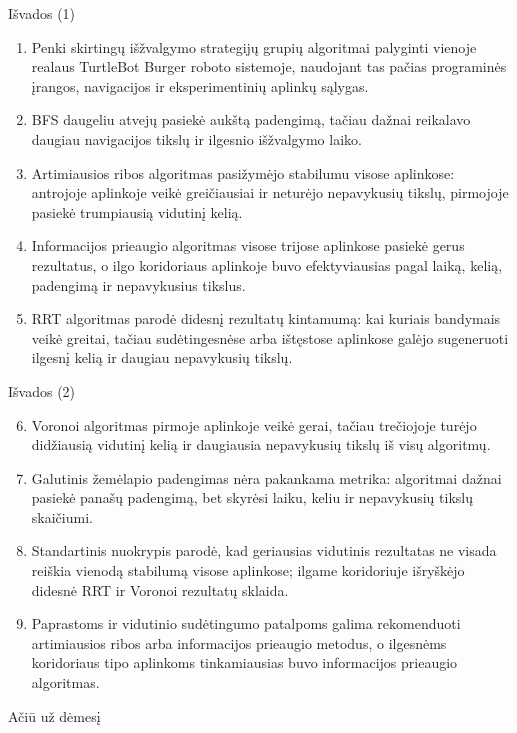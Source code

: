\documentclass[12pt]{beamer}
\begin{document}
\begin{frame}{Išvados (1)}
    \scriptsize
    \begin{enumerate}
        \item Penki skirtingų išžvalgymo strategijų grupių algoritmai palyginti vienoje realaus TurtleBot Burger roboto sistemoje, naudojant tas pačias programinės įrangos, navigacijos ir eksperimentinių aplinkų sąlygas.
        \item BFS daugeliu atvejų pasiekė aukštą padengimą, tačiau dažnai reikalavo daugiau navigacijos tikslų ir ilgesnio išžvalgymo laiko.
        \item Artimiausios ribos algoritmas pasižymėjo stabilumu visose aplinkose: antrojoje aplinkoje veikė greičiausiai ir neturėjo nepavykusių tikslų, pirmojoje pasiekė trumpiausią vidutinį kelią.
        \item Informacijos prieaugio algoritmas visose trijose aplinkose pasiekė gerus rezultatus, o ilgo koridoriaus aplinkoje buvo efektyviausias pagal laiką, kelią, padengimą ir nepavykusius tikslus.
        \item RRT algoritmas parodė didesnį rezultatų kintamumą: kai kuriais bandymais veikė greitai, tačiau sudėtingesnėse arba ištęstose aplinkose galėjo sugeneruoti ilgesnį kelią ir daugiau nepavykusių tikslų.
    \end{enumerate}
\end{frame}

\begin{frame}{Išvados (2)}
    \scriptsize
    \begin{enumerate}
        \setcounter{enumi}{5}
        \item Voronoi algoritmas pirmoje aplinkoje veikė gerai, tačiau trečiojoje turėjo didžiausią vidutinį kelią ir daugiausia nepavykusių tikslų iš visų algoritmų.
        \item Galutinis žemėlapio padengimas nėra pakankama metrika: algoritmai dažnai pasiekė panašų padengimą, bet skyrėsi laiku, keliu ir nepavykusių tikslų skaičiumi.
        \item Standartinis nuokrypis parodė, kad geriausias vidutinis rezultatas ne visada reiškia vienodą stabilumą visose aplinkose; ilgame koridoriuje išryškėjo didesnė RRT ir Voronoi rezultatų sklaida.
        \item Paprastoms ir vidutinio sudėtingumo patalpoms galima rekomenduoti artimiausios ribos arba informacijos prieaugio metodus, o ilgesnėms koridoriaus tipo aplinkoms tinkamiausias buvo informacijos prieaugio algoritmas.
    \end{enumerate}
\end{frame}

\begin{frame}
    \begin{center}
        \Huge Ačiū už dėmesį
    \end{center}
\end{frame}
\end{document}
